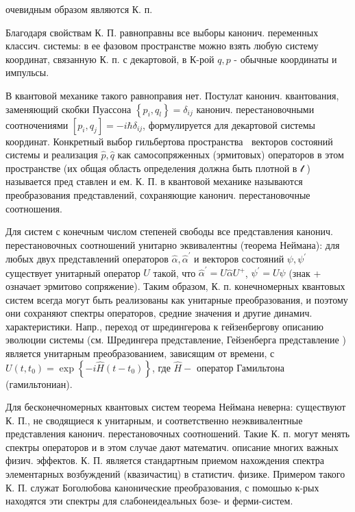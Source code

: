 \documentclass[10pt]{article}
\begin{document}
очевидным образом являются К. п.



Благодаря свойствам К. П. равноправны все выборы канонич. переменных классич. системы: в ее фазовом пространстве можно взять любую систему координат, связанную К. п. с декартовой, в К-рой $q, p$ - обычные координаты и импульсы.



В квантовой механике такого равноправия нет. Постулат канонич. квантования, заменяющий скобки Пуассона $\left\{p_{i}, q_{l}\right\}=\delta_{i j}$ канонич. перестановочными соотночениями $\left[p_{i}, q_{j}\right]=-i \hbar \delta_{i j}$, формулируется для декартовой системы координат. Конкретный выбор гильбертова пространства $\mathscr{\mathcal { ~ }}$ векторов состояний системы и реализация $\hat{p}, \hat{q}$ как самосопряженных (эрмитовых) операторов в этом пространстве (их общая область определения должна быть плотной в $\mathscr{t}$ ) называется пред ставлен и ем. К. П. в квантовой механике называются преобразования представлений, сохраняющие канонич. перестановочные соотношения.



Для систем с конечным числом степеней свободы все представления канонич. перестановочных соотношений унитарно эквивалентны (теорема Неймана): для любых двух представлений операторов $\hat{\alpha}, \hat{\alpha}^{\prime}$ и векторов состояний $\psi, \psi^{\prime}$ существует унитарный оператор $U$ такой, что $\hat{\alpha}^{\prime}=U \hat{\alpha} U^{+}$, $\psi^{\prime}=U \psi$ (знак + означает эрмитово сопряжение). Таким образом, К. п. конечномерных квантовых систем всегда могут быть реализованы как унитарные преобразования, и поэтому они сохраняют спектры операторов, средние значения и другие динамич. характеристики. Напр., переход от шредингерова к гейзенбергову описанию эволюции системы (см. Шредингера представление, Гейзенберга представление ) является унитарным преобразованием, зависящим от времени, с $U\left(t, t_{0}\right)=\exp \left\{-i \hat{H}\left(t-t_{0}\right)\right\}$, где $\hat{H}-$ оператор Гамильтона (гамильтониан).



Для бесконечномерных квантовых систем теорема Неймана неверна: существуют К. П., не сводящиеся к унитарным, и соответственно неэквивалентные представления канонич. перестановочных соотношений. Такие К. п. могут менять спектры операторов и в этом случае дают математич. описание многих важных физич. эффектов. К. П. является стандартным приемом нахождения спектра элементарных возбуждений (квазичастиц) в статистич. физике. Примером такого К. П. служат Боголюбова канонические преобразования, с помошью к-рых находятся эти спектры для слабонеидеальных бозе- и ферми-систем.
\end{document}
